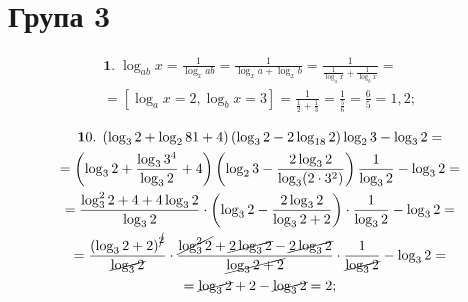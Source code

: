 \section*{Група 3}

\begin{multline*}
{\mathbf 1.}\;
\log_{ab} x = \frac{1}{\log_x ab} = \frac{1}{\log_x a + \log_x b} = \frac{1}{\frac{1}{\log_a x} + \frac{1}{\log_b x}} =\\
= \left[\log_a x = 2, \log_b x = 3\right] = \frac{1}{\frac{1}{2} + \frac{1}{3}} = \frac{1}{\frac{5}{6}} = \frac{6}{5} = 1,2;
\end{multline*}

\begin{multline*}
{\mathbf 10.}\;
\left(\log_3 2 + \log_2 81 + 4\right)\left(\log_3 2 - 2\log_{18} 2\right)\log_2 3 - \log_3 2 =\\
= \left(\log_3 2 + \frac{\log_3 3^4}{\log_3 2} + 4\right)\left(\log_2 3 - \frac{2\log_3 2}{\log_3 (2 \cdot 3^2)}\right)\frac{1}{\log_3 2} - \log_3 2 =\\
= \frac{\log_3^2 2 + 4 + 4\log_3 2}{\log_3 2} \cdot \left(\log_3 2 - \frac{2\log_3 2}{\log_3 2 + 2}\right) \cdot \frac{1}{\log_3 2} - \log_3 2 =\\
= \frac{\left(\log_3 2 + 2\right)^{\cancel{2}}}{\cancel{\log_3 2}} \cdot \frac{\cancel{\log_3^2 2} + \cancel{2\log_3 2} - \cancel{2\log_3 2}}{\cancel{\log_3 2 + 2}} \cdot \frac{1}{\cancel{\log_3 2}} - \log_3 2 =\\
= \cancel{\log_3 2} + 2 - \cancel{\log_3 2} = 2;
\end{multline*}